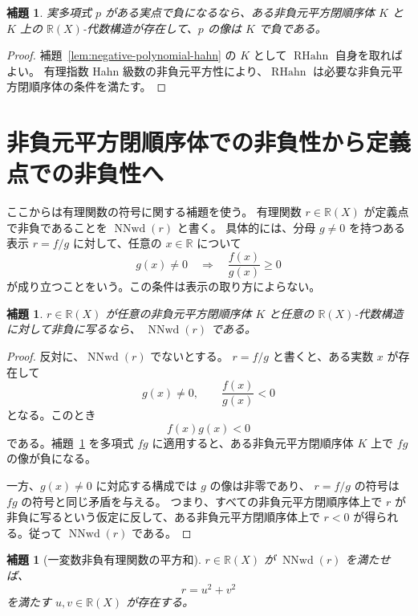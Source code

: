 \documentclass[uplatex,dvipdfmx]{jsarticle}
\newcommand{\Frac}{\mathbb{R}(X)}
\newcommand{\RationalHahn}{\operatorname{RHahn}}
\newcommand{\NNwd}{\operatorname{NNwd}}
\theoremstyle{matrixsosdefinition}
\newtheorem{lemma}[theorem]{補題}
\begin{document}
\begin{lemma}\label{lem:negative-polynomial-nonneg-square-closed}
  実多項式 \(p\) がある実点で負になるなら、ある非負元平方閉順序体 \(K\) と
  \(K\) 上の \(\Frac\)-代数構造が存在して、\(p\) の像は \(K\) で負である。
\end{lemma}

\begin{proof}
  補題~\ref{lem:negative-polynomial-hahn} の \(K\) として \(\RationalHahn\) 自身を取ればよい。
  有理指数 Hahn 級数の非負元平方性により、\(\RationalHahn\) は必要な非負元平方閉順序体の条件を満たす。
\end{proof}

\section{非負元平方閉順序体での非負性から定義点での非負性へ}

ここからは有理関数の符号に関する補題を使う。
有理関数 \(r\in\Frac\) が定義点で非負であることを \(\NNwd(r)\) と書く。
具体的には、分母 \(g\ne0\) を持つある表示 \(r=f/g\)
に対して、任意の \(x\in\mathbb{R}\) について
\[
  g(x)\ne0 \quad\Longrightarrow\quad \frac{f(x)}{g(x)}\ge0
\]
が成り立つことをいう。この条件は表示の取り方によらない。

\begin{lemma}\label{lem:nonneg-in-all-extensions-implies-nonneg-where-defined}
  \(r\in\Frac\) が任意の非負元平方閉順序体 \(K\) と任意の \(\Frac\)-代数構造に対して非負に写るなら、
  \(\NNwd(r)\) である。
\end{lemma}

\begin{proof}
  反対に、\(\NNwd(r)\) でないとする。
  \(r=f/g\) と書くと、ある実数 \(x\) が存在して
  \[
    g(x)\ne0,\qquad \frac{f(x)}{g(x)}<0
  \]
  となる。このとき
  \[
    f(x)g(x)<0
  \]
  である。補題~\ref{lem:negative-polynomial-nonneg-square-closed} を多項式 \(fg\) に適用すると、ある非負元平方閉順序体 \(K\) 上で
  \(f g\) の像が負になる。

  一方、\(g(x)\ne0\) に対応する構成では \(g\) の像は非零であり、
  \(r=f/g\) の符号は \(fg\) の符号と同じ矛盾を与える。
  つまり、すべての非負元平方閉順序体上で \(r\) が非負に写るという仮定に反して、ある非負元平方閉順序体上で
  \(r<0\) が得られる。従って \(\NNwd(r)\) である。
\end{proof}

\begin{lemma}[一変数非負有理関数の平方和]\label{lem:nonneg-rational-function-sum-two-squares}
  \(r\in\Frac\) が \(\NNwd(r)\) を満たせば、
  \[
    r=u^2+v^2
  \]
  を満たす \(u,v\in\Frac\) が存在する。
\end{lemma}
\end{document}
